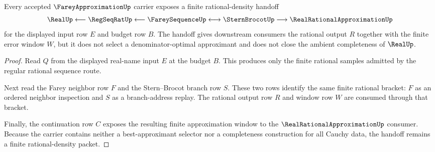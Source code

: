 \begin{theorem}
\label{thm:farey-approximation-real-density-handoff}
Every accepted $\FareyApproximationUp$ carrier exposes a finite rational-density handoff
$$
\RealUp \longleftarrow \RegSeqRatUp \longleftarrow \FareySequenceUp \longleftrightarrow \SternBrocotUp \longrightarrow \RealRationalApproximationUp
$$
for the displayed input row $E$ and budget row $B$. The handoff gives downstream consumers the rational output $R$ together with the finite error window $W$, but it does not select a denominator-optimal approximant and does not close the ambient completeness of $\RealUp$.
\end{theorem}
\begin{proof}
Read $Q$ from the displayed real-name input $E$ at the budget $B$. This produces only the finite rational samples admitted by the regular rational sequence route.

Next read the Farey neighbor row $F$ and the Stern--Brocot branch row $S$. These two rows identify the same finite rational bracket: $F$ as an ordered neighbor inspection and $S$ as a branch-address replay. The rational output row $R$ and window row $W$ are consumed through that bracket.

Finally, the continuation row $C$ exposes the resulting finite approximation window to the $\RealRationalApproximationUp$ consumer. Because the carrier contains neither a best-approximant selector nor a completeness construction for all Cauchy data, the handoff remains a finite rational-density packet.
\end{proof}


\begin{closurestatus}{\FareyApproximationUp}
  \theoryclosure{\seedClosure}
  \formalstatus{\unformalizedV}
\end{closurestatus}
